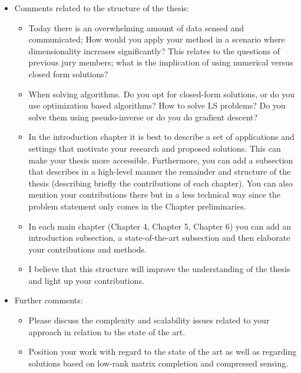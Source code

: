 \documentclass[11pt]{article}
\begin{document}
\begin{itemize}
    \item Comments related to the structure of the thesis:
    \begin{itemize}
    
    \item  Today there is an overwhelming amount of data sensed and communicated; How would you apply your method in a scenario where dimensionality increases significantly? This relates to the questions of previous jury members; what is the implication of using numerical versus closed form solutions?
	
    \item When solving algorithms. Do you opt for closed-form solutions, or do you use optimization based algorithms? How to solve LS problems? Do you solve them using pseudo-inverse or do you do gradient descent?
	
    \item In the introduction chapter it is best to describe a set of applications and settings that motivate your research and proposed solutions. This can make your thesis more accessible. Furthermore, you can add a subsection that describes in a high-level manner the remainder and structure of the thesis (describing briefly the contributions of each chapter). You can also mention your contributions there but in a less technical way since the problem statement only comes in the Chapter preliminaries.

	\item In each main chapter (Chapter 4, Chapter 5, Chapter 6) you can add an introduction subsection, a state-of-the-art subsection and then elaborate your contributions and methods.

	\item I believe that this structure will improve the understanding of the thesis and light up your contributions.
	
	\end{itemize}
	\item Further comments:
	\begin{itemize}
	\item Please discuss the complexity and scalability issues related to your approach in relation to the state of the art.
	
	\item Position your work with regard to the state of the art as well as regarding solutions based on low-rank matrix completion and compressed sensing.
	

\end{itemize}
\end{itemize}
\end{document}
